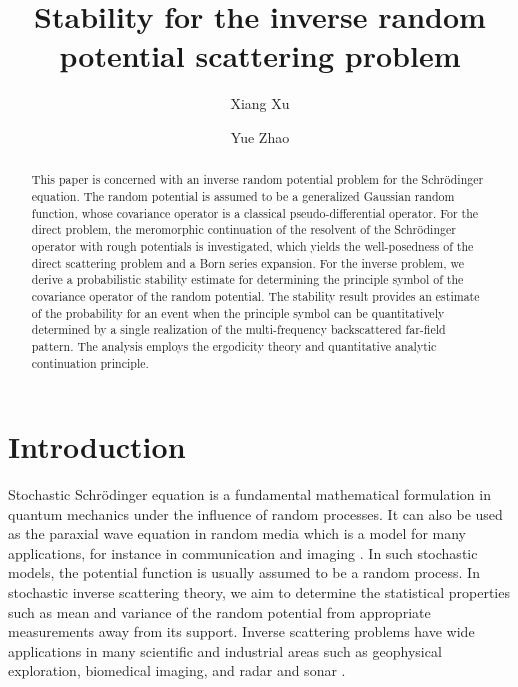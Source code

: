 \documentclass[reqno, 12pt]{amsart}
\title[Inverse potential problem]{Stability for the inverse random potential scattering problem}
\author[X. Xu]{Xiang Xu}
\author[Y. Zhao]{Yue Zhao}
\numberwithin{equation}{section}
\begin{document}
\begin{abstract}
This paper is concerned with an inverse random potential problem for the Schr\"odinger equation. The random potential is assumed to be
a generalized Gaussian random function, whose covariance operator is a classical pseudo-differential operator. 
For the direct problem, the meromorphic continuation of the resolvent of the Schr\"odinger operator with rough potentials is investigated,
which yields the well-posedness of the direct scattering problem and a Born series expansion. For the inverse problem,
we derive a probabilistic stability
estimate for determining the principle symbol of the covariance operator of the random potential. The stability result provides an estimate 
of the probability for an event when the principle symbol can be quantitatively determined by a single realization of the multi-frequency backscattered far-field pattern.
The analysis employs the ergodicity theory and quantitative analytic continuation principle.

\end{abstract}

\maketitle

\section{Introduction}

Stochastic Schr\"odinger equation is a fundamental mathematical formulation in quantum mechanics under the influence of random processes. 
It can also be used as the paraxial wave equation in random media which is a model for many applications, for instance in communication and imaging
\cite{GS, GS-MMS, GSARMA, GPT}.
In such stochastic models, the potential function is usually assumed to be a random process. In stochastic inverse scattering theory, we aim to determine the statistical properties such as mean and variance of the random potential from appropriate measurements away from its support. 
Inverse scattering problems have wide applications in many scientific and industrial areas such as geophysical exploration, biomedical imaging, and radar and sonar \cite{Colton}.
\end{document}

